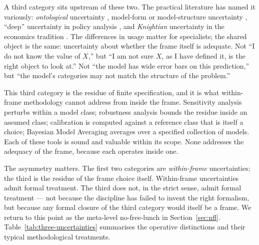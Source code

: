 \documentclass[11pt,a4paper]{article}
\begin{document}
A third category sits upstream of these two. The practical literature has
named it variously: \emph{ontological} uncertainty
\citep{Wynne1992,Walker2003,FuntowiczRavetz1990}, model-form or
model-structure uncertainty \citep{DraperJRSS1995,HoetingBMA1999},
``deep'' uncertainty in policy analysis \citep{Lempert2003}, and
\emph{Knightian} uncertainty in the economics tradition
\citep{Knight1921}. The differences in usage matter for specialists; the
shared object is the same: uncertainty about whether the frame itself is
adequate. Not ``I do not know the value of $X$,'' but ``I am not sure
$X$, as I have defined it, is the right object to look at.'' Not ``the
model has wide error bars on this prediction,'' but ``the model's
categories may not match the structure of the problem.''

This third category is the residue of finite specification, and it is
what within-frame methodology cannot address from inside the frame.
Sensitivity analysis perturbs within a model class; robustness analysis
bounds the residue inside an assumed class; calibration is computed
against a reference class that is itself a choice; Bayesian Model
Averaging averages over a specified collection of models. Each of these
tools is sound and valuable within its scope. None addresses the adequacy
of the frame, because each operates inside one.

The asymmetry matters. The first two categories are \emph{within-frame}
uncertainties; the third is the residue of the frame choice itself.
Within-frame uncertainties admit formal treatment. The third does not, in
the strict sense, admit formal treatment --- not because the discipline
has failed to invent the right formalism, but because any formal closure
of the third category would itself be a frame. We return to this point as
the meta-level no-free-lunch in Section~\ref{sec:nfl}.
Table~\ref{tab:three-uncertainties} summarises the operative distinctions
and their typical methodological treatments.
\end{document}
